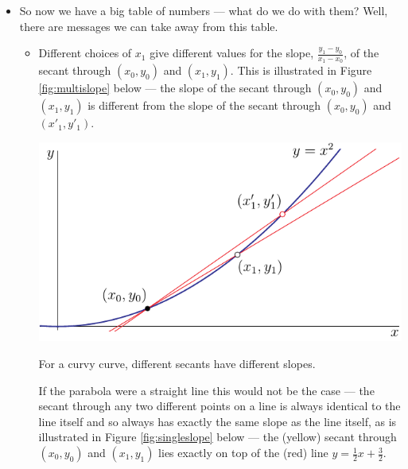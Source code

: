 \begin{eg}
\begin{itemize}
\item So now we have a big table of numbers --- what do we do with them?
Well, there are messages we can take away from this table.
\begin{itemize}
\item
   Different choices of $x_1$ give different values for the
   slope, $\tfrac{y_1-y_0}{x_1-x_0}$, of the secant through
   $(x_0,y_0)$ and $(x_1,y_1)$. This is illustrated in Figure
   \ref{fig:multislope} below
   --- the slope of the secant through $(x_0,y_0)$ and $(x_1,y_1)$ is different from the
slope of the secant through $(x_0,y_0)$ and $(x'_1,y'_1)$.

  \begin{sfig}
  \label{fig:multislope}
  \begin{center}
  \includegraphics{slopeD}

   For a curvy curve, different secants have different slopes.
  \end{center}
  \end{sfig}

   If the parabola were a straight
   line this would not be the case  --- the secant through any two different
   points on a line is always identical to the line itself and so always
   has exactly the same slope as the line itself, as is illustrated in
   Figure \ref{fig:singleslope} below --- the (yellow) secant through
   $(x_0,y_0)$ and $(x_1,y_1)$ lies exactly on top of the (red)
   line $y=\tfrac{1}{2}x+\tfrac{3}{2}$.



\end{itemize}
\end{itemize}
\end{eg}
